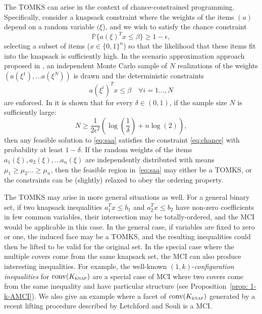 The TOMKS can arise in the context of chance-constrained programming.  Specifically, consider a knapsack constraint where the weights of the items $(a)$ depend on a random variable $(\xi$), and we wish to satisfy the chance constraint
\begin{equation}
  \mathbb{P} \{ a(\xi)^T x \leq \beta \} \geq 1-\epsilon, \label{eq:chance}
\end{equation}
selecting a subset of items ($x \in \{0,1\}^n$) so that the likelihood that these items fit into the knapsack is sufficiently high.
In the scenario approximation approach proposed in \cite{MR2232597,nemirovski.shapiro:05}, an independent Monte Carlo sample of $N$ realizations of the weights $(a(\xi^1), \ldots a(\xi^N))$ is drawn and the deterministic constraints
\begin{equation}
  a(\xi^i)^T x \leq \beta \quad \forall i=1\ldots,N \label{eq:saa} 
\end{equation} 
are enforced.   
In \cite{MR2425035} it is shown that for every $\delta \in (0,1)$, if the sample size $N$ is sufficiently large:
\[ N \geq \frac{1}{2 \epsilon^2} \left( \log \left( \frac{1}{\delta} \right) + n \log(2) \right), \]
then any feasible solution to \eqref{eq:saa} satisfies the constraint \eqref{eq:chance} with probability at least $1-\delta$.
If the random weights of the items $a_1(\xi), a_2(\xi), \ldots a_n(\xi)$ are independently distributed with means $\mu_1 \geq \mu_2 \ldots \geq \mu_n$, then the feasible region in~\eqref{eq:saa} may either be a TOMKS, or the constraints can be (slightly) relaxed to obey the ordering property.

The TOMKS may arise in more general situations as well.  For a general binary set, if two knapsack inequalities $a_1^T x \leq b_1$ and $a_2^T x \leq b_2$ have non-zero coefficients in few common variables, their intersection may be totally-ordered, and the MCI would be applicable in this case.  In the general case, if variables are fixed to zero or one, the induced face may be a TOMKS, and the resulting inequalities could then be lifted to be valid for the original set. 
In the special case where the multiple covers come from the same knapsack set, the MCI can also produce interesting inequalities. 
For example, the well-known $(1,k)$-\emph{configuration inequalities} for $\operatorname{conv}(K_{\mbox{\scriptsize \sc knap}})$ \cite{padberg19801} are a special case of MCI where two covers come from the same inequality and have particular structure (see Proposition~\ref{prop: 1-k-AMCI}). 
We also give an example where a facet of $\operatorname{conv}(K_{\mbox{\scriptsize \sc knap}})$ generated by a recent lifting procedure described by Letchford and Souli \cite{letchford2019lifted} is a MCI.

